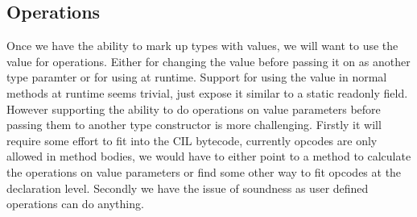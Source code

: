 \subsection{Operations}

Once we have the ability to mark up types with values, we will want
to use the value for operations. Either for changing the value before
passing it on as another type paramter or for using at runtime. Support
for using the value in normal methods at runtime seems trivial, just
expose it similar to a static readonly field. However supporting the
ability to do operations on value parameters before passing them to
another type constructor is more challenging. Firstly it will require
some effort to fit into the CIL bytecode, currently opcodes are only
allowed in method bodies, we would have to either point to a method
to calculate the operations on value parameters or find some other
way to fit opcodes at the declaration level. Secondly we have the
issue of soundness as user defined operations can do anything.